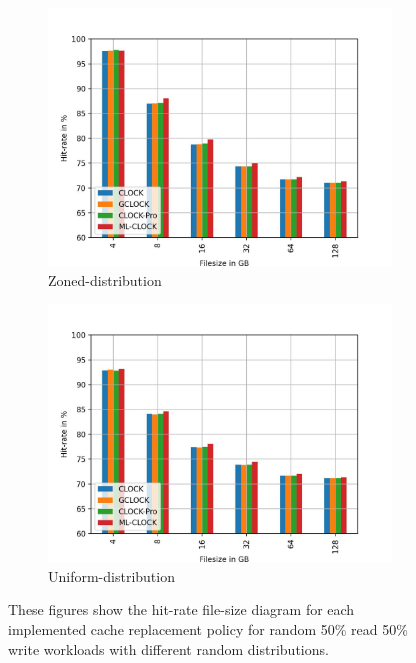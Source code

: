 \documentclass[
	12pt,
	a4paper,
	abstract,
	bibliography=totoc,
	chapterprefix,
	headings=openright,
	numbers=endperiod,
	parskip=half,
	twoside,
]{scrreprt}
\begin{document}
\begin{figure}
\begin{subfigure}{0.4\textwidth}
		\includegraphics[width=\textwidth]{rw_50to50_zoned.jpg}		
		\caption{Zoned-distribution}
		\label{fig:rw_90to10  zoned}
	\end{subfigure}
	\hfill
	\begin{subfigure}{0.4\textwidth}
		\includegraphics[width=\textwidth]{rw_50to50_uniform.jpg}		
		\caption{Uniform-distribution}
		\label{fig:rw_90to10  uniform}
	\end{subfigure}
	\caption{These figures show the hit-rate file-size diagram for each implemented 		cache replacement policy for random 50\% read 50\% write workloads with different random distributions.}
\end{figure}

\end{document}
